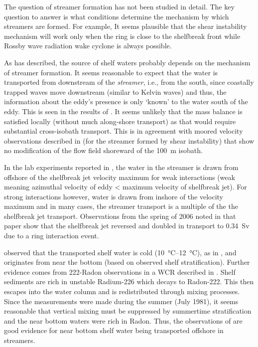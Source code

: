 The question of streamer formation has not been studied in detail. The key question to answer is what conditions determine the mechanism by which streamers are formed. For example, It seems plausible that the shear instability mechanism will work only when the ring is close to the shelfbreak front while Rossby wave radiation wake cyclone is always possible. 


As \cite{Ramp1986} has described, the source of shelf waters probably depends on the mechanism of streamer formation. It seems reasonable to expect that the water is transported from downstream of the \emph{streamer}, i.e., from the south, since coastally trapped waves move downstream (similar to Kelvin waves) and thus, the information about the eddy’s presence is only ‘known’ to the water south of the eddy.  This is seen in the results of \cite{Chapman1987}. It seems unlikely that the mass balance is satisfied locally (without much along-shore transport) as that would require substantial cross-isobath transport. This is in agreement with moored velocity observations described in \cite{Ramp1986} (for the streamer formed by shear instability) that show no modification of the flow field shoreward of the \SI{100}{\m} isobath. 

In the lab experiments reported in \cite{Cenedese2012}, the water in the streamer is drawn from offshore of the shelfbreak jet velocity maximum for weak interactions (weak meaning azimuthal velocity of eddy < maximum velocity of shelfbreak jet). For strong interactions however, water is drawn from inshore of the velocity maximum and in many cases, the streamer transport is a multiple of the the shelfbreak jet transport. Observations from the spring of 2006 noted in that paper show that the shelfbreak jet reversed and doubled in transport to \SI{0.34}{Sv} due to a ring interaction event.

\cite{Churchill1986} observed that the transported shelf water is cold (\SIrange{10}{12}{\degreeCelsius}), as in \cite{Joyce1992}, and originates from near the bottom (based on observed shelf stratification). Further evidence comes from 222-Radon observations in a WCR described in \cite{Orr1985}.  Shelf sediments are rich in unstable Radium-226 which decays to Radon-222. This then escapes into the water column and is redistributed through mixing processes. Since the measurements were made during the summer (July 1981), it seems reasonable that vertical mixing must be suppressed by summertime stratification and the near bottom waters were rich in Radon. Thus, the observations of \cite{Orr1985} are good evidence for near bottom shelf water being transported offshore in streamers.  

